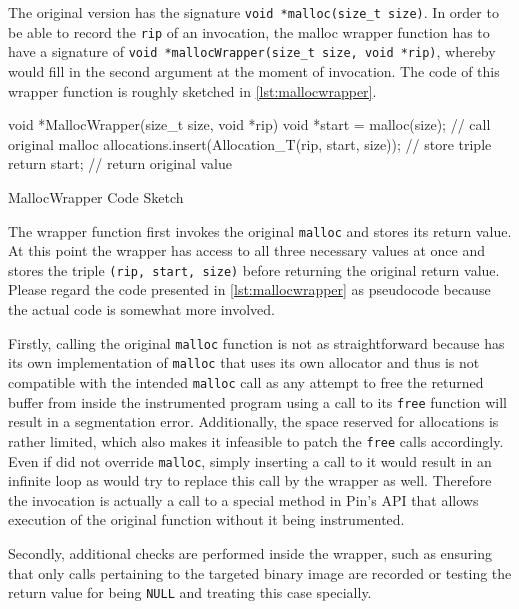 The original version has the signature \texttt{void *malloc(size_t size)}. In order to be able to
record the \texttt{rip} of an invocation, the malloc wrapper function has to have a signature of 
\texttt{void *mallocWrapper(size_t size, void *rip)}, whereby \pin would fill in the second argument
at the moment of invocation. The code of this wrapper function is roughly sketched in \cref{lst:mallocwrapper}.

\begin{listing}[htb]
\centering
\begin{cppcode}
void *MallocWrapper(size_t size, void *rip) {
	void *start = malloc(size); // call original malloc
	allocations.insert(Allocation_T(rip, start, size)); // store triple
	return start; // return original value
}
\end{cppcode}
\caption{MallocWrapper Code Sketch}
\label{lst:mallocwrapper}
\end{listing}

The wrapper function first invokes the original \texttt{malloc} and stores its return value. At this point the
wrapper has access to all three necessary values at once and stores the triple \texttt{(rip, start, size)}
before returning the original return value. Please regard the code presented in \cref{lst:mallocwrapper} as
pseudocode because the actual code is somewhat more involved.

Firstly, calling the original \texttt{malloc} function is not as straightforward because \pin has its own
implementation of \texttt{malloc} that uses its own allocator and thus is not compatible with the intended
\texttt{malloc} call as any attempt to free the returned buffer from inside the instrumented program using a
call to its \texttt{free} function will result in a segmentation error. Additionally, the space reserved for
\pin allocations is rather limited, which also makes it infeasible to patch the \texttt{free} calls
accordingly. Even if \pin did not override \texttt{malloc}, simply inserting a call to it would result in an
infinite loop as \pin would try to replace this call by the wrapper as well. Therefore the invocation is
actually a call to a special method in {\small Pin's} API that allows execution of the original function
without it being instrumented.

Secondly, additional checks are performed inside the wrapper, such as ensuring that only calls pertaining to
the targeted binary image are recorded or testing the return value for being \texttt{NULL} and treating this
case specially.

